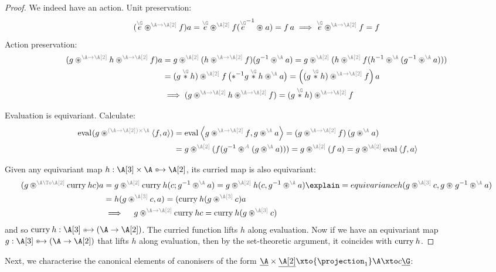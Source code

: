 \begin{proof}
  We indeed have an action. Unit preservation:
  \[
  (\unit[\G] \act[\A \to \B] f)a
  = \unit[\G]\act[\B] f(\inv{\unit[\G]}\act a) = f\,a
  \implies
  \unit[\G] \act[\A \to \B] f = f
  \]
  Action preservation:
  \begin{align*}
  (g \act[\A \to \B] h \act[\A\to\B] f)a
  &=
  g \act[\B] (h \act[\A\to\B] f)(\inv g \act[\A] a)
  =
  g \act[\B] (h \act[\B] f(\inv h \act[\A] (\inv g \act[\A] a)))
  \\&=
  (g \mul[\G] h) \act[\B] f\parent{\inv*{\smash{g \mul[\G] h}}\act[\A] a}
  =
  \parent{(g \mul[\G] h) \act[\A \to \B] f} a
  \\&\implies
  (g \act[\A \to \B] h \act[\A\to\B] f) = (g \mul[\G] h) \act[\A \to \B] f
  \end{align*}

  Evaluation is equivariant. Calculate:
  \begin{align*}
  \eval(g \act[(\A\to\B)\times \A] \pair fa)
  &=
  \eval\pair{g\act[\A\to\B] f}{g\act[\A] a}
  =
  (g\act[\A\to\B]f)\,(g\act[\A] a)
  \\&=
  g \act[\B] (f(\inv g \act[A] (g \act[\A] a)))
  =
  g \act[\B] (f\,a)
  =
  g \act[\B] \eval\pair fa
  \tag*{\qedhere}
  \end{align*}

  Given any equivariant map $h : \C \times \A \equito \B$, its curried
  map is also equivariant:
  \begin{align*}
    (g \act[\A \To \B] \curry h c)a
    &=
    g \act[\B] \curry h (c; \inv g \act[\A] a)
    =
    g \act[\B] h (c, \inv g \act[\A] a)
    \explain={equivariance}
    h (g \act[\C] c, g \act \inv g \act[\A] a)
    \\&=
    h (g \act[\C] c, a)
    =
    (\curry h (g \act[\C]c) a
    \\&\implies\quad
    g \act[\A \to \B] \curry h c = \curry h (g \act[\C] c)
  \end{align*}
  and so $\curry h : \C \equito (\A \to \B)$. The curried function
  lifts $h$ along evaluation. Now if we have an equivariant map $g :
  \C \equito (\A \to \B)$ that lifts $h$ along evaluation, then by the
  set-theoretic argument, it coincides with $\curry h$.
\end{proof}

Next, we characterise the canonical elements of
canonisers of the form $\carrier \A \times \carrier \B \xto{\projection_1}\A \xto\canoniser \carrier\G$:

